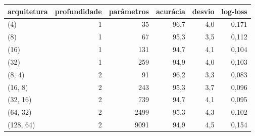 
\begin{tabular}{lrrrrr}
\toprule
\textbf{arquitetura} & \textbf{profundidade} & \textbf{parâmetros} & \textbf{acurácia} & \textbf{desvio} & \textbf{log-loss} \\
\midrule
(4) & 1 & 35 & 96{,}7 & 4{,}0 & 0{,}171 \\
(8) & 1 & 67 & 95{,}3 & 3{,}5 & 0{,}112 \\
(16) & 1 & 131 & 94{,}7 & 4{,}1 & 0{,}104 \\
(32) & 1 & 259 & 94{,}9 & 4{,}0 & 0{,}103 \\
(8, 4) & 2 & 91 & 96{,}2 & 3{,}3 & 0{,}083 \\
(16, 8) & 2 & 243 & 95{,}3 & 3{,}7 & 0{,}096 \\
(32, 16) & 2 & 739 & 94{,}7 & 4{,}1 & 0{,}095 \\
(64, 32) & 2 & 2499 & 95{,}3 & 4{,}3 & 0{,}102 \\
(128, 64) & 2 & 9091 & 94{,}9 & 4{,}5 & 0{,}154 \\
\bottomrule
\end{tabular}
